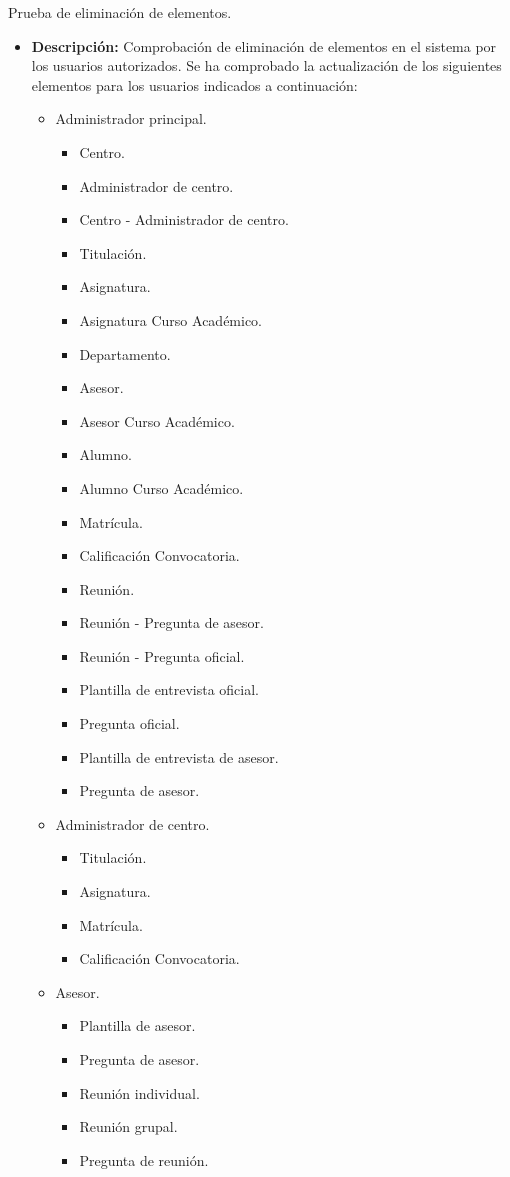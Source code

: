 \item Prueba de eliminación de elementos.
  \begin{itemize}
    \item \textbf{Descripción:} Comprobación de eliminación de elementos
    en el sistema por los usuarios autorizados. Se ha comprobado la
    actualización de los siguientes elementos para los usuarios indicados a
    continuación:

    \begin{itemize}
      \item Administrador principal.
      \begin{itemize}
        \item Centro.
        \item Administrador de centro.
        \item Centro - Administrador de centro.
        \item Titulación.
        \item Asignatura.
        \item Asignatura Curso Académico.
        \item Departamento.
        \item Asesor.
        \item Asesor Curso Académico.
        \item Alumno.
        \item Alumno Curso Académico.
        \item Matrícula.
        \item Calificación Convocatoria.
        \item Reunión.
        \item Reunión - Pregunta de asesor.
        \item Reunión - Pregunta oficial.
        \item Plantilla de entrevista oficial.
        \item Pregunta oficial.
        \item Plantilla de entrevista de asesor.
        \item Pregunta de asesor.
      \end{itemize}
      \item Administrador de centro.
      \begin{itemize}
        \item Titulación.
        \item Asignatura.
        \item Matrícula.
        \item Calificación Convocatoria.
      \end{itemize}
      \item Asesor.
      \begin{itemize}
        \item Plantilla de asesor.
        \item Pregunta de asesor.
        \item Reunión individual.
        \item Reunión grupal.
        \item Pregunta de reunión.
      \end{itemize}
    \end{itemize}


\end{itemize}
